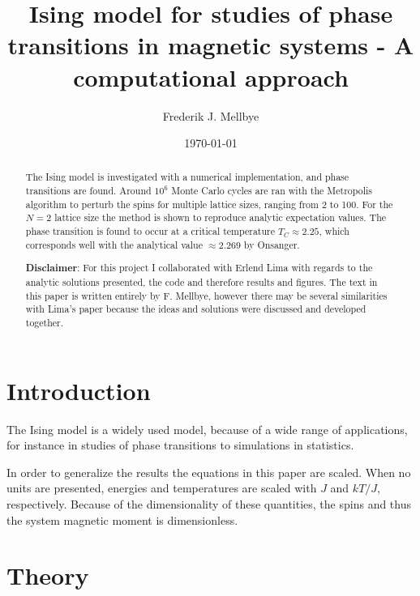 \documentclass[aps,reprint]{revtex4-1}
\begin{document}
\title{Ising model for studies of phase transitions in magnetic systems - A computational approach}
\author{Frederik J. Mellbye}
\date{\today}

\begin{abstract}\noindent
The Ising model is investigated with a numerical implementation, and phase transitions
are found. Around $10^6$ Monte Carlo cycles are ran with the Metropolis
algorithm to perturb the spins for multiple lattice sizes, ranging from
2 to 100. For the $N = 2$ lattice size the method is shown to reproduce analytic
expectation values. The phase transition is found to occur at a critical temperature
$T_C \approx 2.25$, which corresponds well with the analytical value $\approx 2.269$ by Onsanger.

\bigskip
\noindent \textbf{Disclaimer}:
\newline
For this project I collaborated with Erlend Lima with regards to the
analytic solutions presented, the code and therefore results and figures.
The text in this paper is written entirely by F. Mellbye, however there may be
several similarities with Lima's paper because the ideas and solutions
were discussed and developed together.
\end{abstract}
\maketitle
\tableofcontents
\makeatletter
\let\toc@pre\relax
\let\toc@post\relax
\makeatother

\newpage

\section{Introduction} \label{sec:introduction}
The Ising model is a widely used model, because of a wide range of applications,
for instance in studies of phase transitions to simulations in statistics.

In order to generalize the results the equations in this paper are scaled.
When no units are presented, energies and temperatures are scaled with $J$ and
$kT/J$, respectively. Because of the dimensionality of these quantities, the spins
and thus the system magnetic moment is dimensionless.
\section{Theory} \label{sec:theory}
\end{document}
